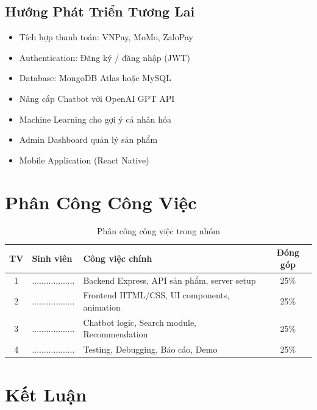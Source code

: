 \documentclass[12pt, a4paper]{report}
\begin{document}
\section{Hướng Phát Triển Tương Lai}

\begin{itemize}[leftmargin=*]
    \item[$\square$] Tích hợp thanh toán: VNPay, MoMo, ZaloPay
    \item[$\square$] Authentication: Đăng ký / đăng nhập (JWT)
    \item[$\square$] Database: MongoDB Atlas hoặc MySQL
    \item[$\square$] Nâng cấp Chatbot với OpenAI GPT API
    \item[$\square$] Machine Learning cho gợi ý cá nhân hóa
    \item[$\square$] Admin Dashboard quản lý sản phẩm
    \item[$\square$] Mobile Application (React Native)
\end{itemize}

\chapter{Phân Công Công Việc}

\begin{table}[H]
    \centering
    \caption{Phân công công việc trong nhóm}
    \begin{tabular}{clp{6.5cm}c}
        \toprule
        \textbf{TV} & \textbf{Sinh viên} & \textbf{Công việc chính} & \textbf{Đóng góp} \\
        \midrule
        1 & .................. & Backend Express, API sản phẩm, server setup  & 25\% \\
        2 & .................. & Frontend HTML/CSS, UI components, animation  & 25\% \\
        3 & .................. & Chatbot logic, Search module, Recommendation & 25\% \\
        4 & .................. & Testing, Debugging, Báo cáo, Demo           & 25\% \\
        \bottomrule
    \end{tabular}
\end{table}

\chapter*{Kết Luận}
\end{document}
